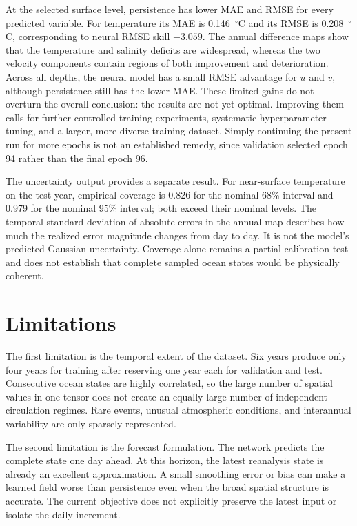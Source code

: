 At the selected surface level, persistence has lower MAE and RMSE for every predicted variable. For temperature its MAE is 0.146~$^{\circ}$C and its RMSE is 0.208~$^{\circ}$C, corresponding to neural RMSE skill $-3.059$. The annual difference maps show that the temperature and salinity deficits are widespread, whereas the two velocity components contain regions of both improvement and deterioration. Across all depths, the neural model has a small RMSE advantage for $u$ and $v$, although persistence still has the lower MAE. These limited gains do not overturn the overall conclusion: the results are not yet optimal. Improving them calls for further controlled training experiments, systematic hyperparameter tuning, and a larger, more diverse training dataset. Simply continuing the present run for more epochs is not an established remedy, since validation selected epoch 94 rather than the final epoch 96.

The uncertainty output provides a separate result. For near-surface temperature on the test year, empirical coverage is 0.826 for the nominal 68\% interval and 0.979 for the nominal 95\% interval; both exceed their nominal levels. The temporal standard deviation of absolute errors in the annual map describes how much the realized error magnitude changes from day to day. It is not the model's predicted Gaussian uncertainty. Coverage alone remains a partial calibration test and does not establish that complete sampled ocean states would be physically coherent.

\section{Limitations}

The first limitation is the temporal extent of the dataset. Six years produce only four years for training after reserving one year each for validation and test. Consecutive ocean states are highly correlated, so the large number of spatial values in one tensor does not create an equally large number of independent circulation regimes. Rare events, unusual atmospheric conditions, and interannual variability are only sparsely represented.

The second limitation is the forecast formulation. The network predicts the complete state one day ahead. At this horizon, the latest reanalysis state is already an excellent approximation. A small smoothing error or bias can make a learned field worse than persistence even when the broad spatial structure is accurate. The current objective does not explicitly preserve the latest input or isolate the daily increment.


